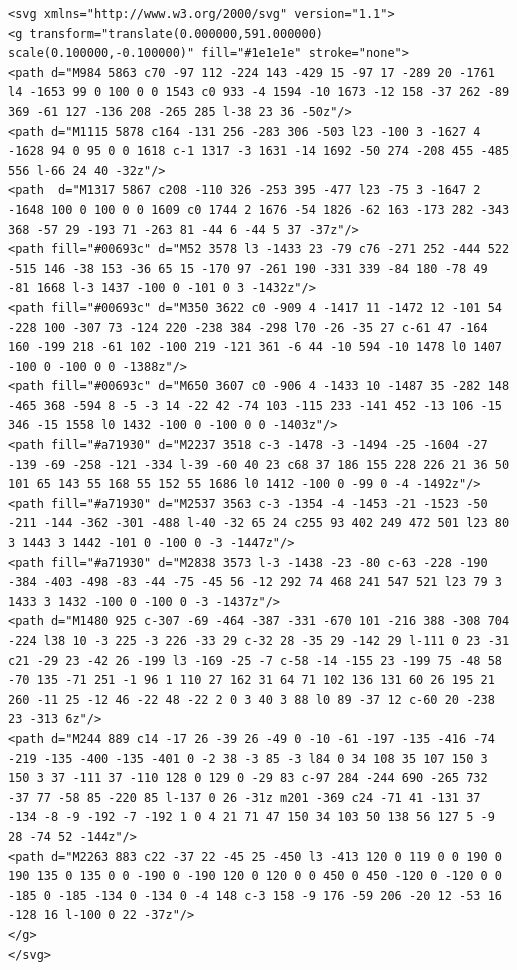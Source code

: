 \begin{lstlisting}[label={lst:logoaghsvg},caption={Logo AGH w zapisie SVG.}]
<svg xmlns="http://www.w3.org/2000/svg" version="1.1">
<g transform="translate(0.000000,591.000000) scale(0.100000,-0.100000)" fill="#1e1e1e" stroke="none">
<path d="M984 5863 c70 -97 112 -224 143 -429 15 -97 17 -289 20 -1761 l4 -1653 99 0 100 0 0 1543 c0 933 -4 1594 -10 1673 -12 158 -37 262 -89 369 -61 127 -136 208 -265 285 l-38 23 36 -50z"/>
<path d="M1115 5878 c164 -131 256 -283 306 -503 l23 -100 3 -1627 4 -1628 94 0 95 0 0 1618 c-1 1317 -3 1631 -14 1692 -50 274 -208 455 -485 556 l-66 24 40 -32z"/>
<path  d="M1317 5867 c208 -110 326 -253 395 -477 l23 -75 3 -1647 2 -1648 100 0 100 0 0 1609 c0 1744 2 1676 -54 1826 -62 163 -173 282 -343 368 -57 29 -193 71 -263 81 -44 6 -44 5 37 -37z"/>
<path fill="#00693c" d="M52 3578 l3 -1433 23 -79 c76 -271 252 -444 522 -515 146 -38 153 -36 65 15 -170 97 -261 190 -331 339 -84 180 -78 49 -81 1668 l-3 1437 -100 0 -101 0 3 -1432z"/>
<path fill="#00693c" d="M350 3622 c0 -909 4 -1417 11 -1472 12 -101 54 -228 100 -307 73 -124 220 -238 384 -298 l70 -26 -35 27 c-61 47 -164 160 -199 218 -61 102 -100 219 -121 361 -6 44 -10 594 -10 1478 l0 1407 -100 0 -100 0 0 -1388z"/>
<path fill="#00693c" d="M650 3607 c0 -906 4 -1433 10 -1487 35 -282 148 -465 368 -594 8 -5 -3 14 -22 42 -74 103 -115 233 -141 452 -13 106 -15 346 -15 1558 l0 1432 -100 0 -100 0 0 -1403z"/>
<path fill="#a71930" d="M2237 3518 c-3 -1478 -3 -1494 -25 -1604 -27 -139 -69 -258 -121 -334 l-39 -60 40 23 c68 37 186 155 228 226 21 36 50 101 65 143 55 168 55 152 55 1686 l0 1412 -100 0 -99 0 -4 -1492z"/>
<path fill="#a71930" d="M2537 3563 c-3 -1354 -4 -1453 -21 -1523 -50 -211 -144 -362 -301 -488 l-40 -32 65 24 c255 93 402 249 472 501 l23 80 3 1443 3 1442 -101 0 -100 0 -3 -1447z"/>
<path fill="#a71930" d="M2838 3573 l-3 -1438 -23 -80 c-63 -228 -190 -384 -403 -498 -83 -44 -75 -45 56 -12 292 74 468 241 547 521 l23 79 3 1433 3 1432 -100 0 -100 0 -3 -1437z"/>
<path d="M1480 925 c-307 -69 -464 -387 -331 -670 101 -216 388 -308 704 -224 l38 10 -3 225 -3 226 -33 29 c-32 28 -35 29 -142 29 l-111 0 23 -31 c21 -29 23 -42 26 -199 l3 -169 -25 -7 c-58 -14 -155 23 -199 75 -48 58 -70 135 -71 251 -1 96 1 110 27 162 31 64 71 102 136 131 60 26 195 21 260 -11 25 -12 46 -22 48 -22 2 0 3 40 3 88 l0 89 -37 12 c-60 20 -238 23 -313 6z"/>
<path d="M244 889 c14 -17 26 -39 26 -49 0 -10 -61 -197 -135 -416 -74 -219 -135 -400 -135 -401 0 -2 38 -3 85 -3 l84 0 34 108 35 107 150 3 150 3 37 -111 37 -110 128 0 129 0 -29 83 c-97 284 -244 690 -265 732 -37 77 -58 85 -220 85 l-137 0 26 -31z m201 -369 c24 -71 41 -131 37 -134 -8 -9 -192 -7 -192 1 0 4 21 71 47 150 34 103 50 138 56 127 5 -9 28 -74 52 -144z"/>
<path d="M2263 883 c22 -37 22 -45 25 -450 l3 -413 120 0 119 0 0 190 0 190 135 0 135 0 0 -190 0 -190 120 0 120 0 0 450 0 450 -120 0 -120 0 0 -185 0 -185 -134 0 -134 0 -4 148 c-3 158 -9 176 -59 206 -20 12 -53 16 -128 16 l-100 0 22 -37z"/>
</g>
</svg>

\end{lstlisting}

